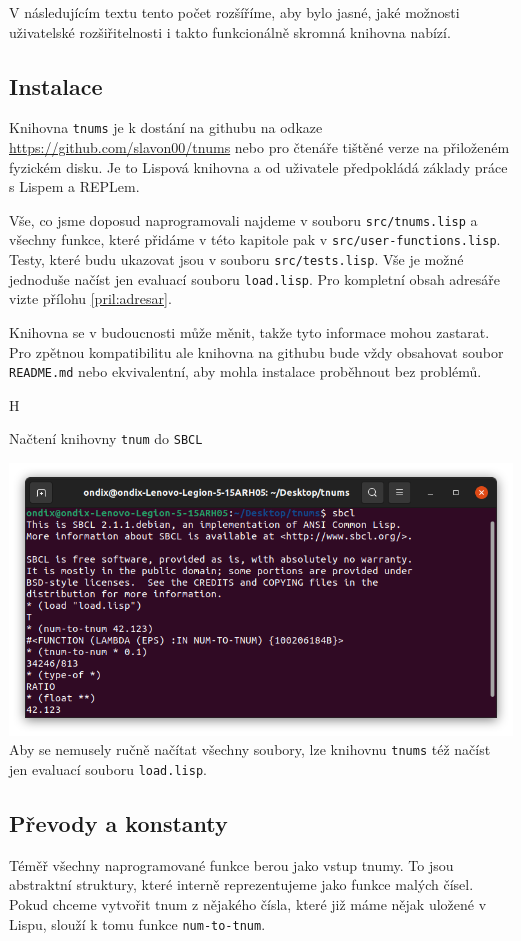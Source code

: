 V následujícím textu tento počet rozšíříme, aby bylo jasné, jaké možnosti uživatelské rozšiřitelnosti i takto funkcionálně skromná knihovna nabízí.

\subsection{Instalace}
Knihovna \texttt{tnums} je k dostání na githubu na odkaze \url{https://github.com/slavon00/tnums} nebo pro čtenáře tištěné verze na přiloženém fyzickém disku. Je to Lispová knihovna a od uživatele předpokládá základy práce s Lispem a REPLem.

Vše, co jsme doposud naprogramovali najdeme v souboru \texttt{src/tnums.lisp} a všechny funkce, které přidáme v této kapitole pak v \texttt{src/user-functions.lisp}. Testy, které budu ukazovat jsou v souboru \texttt{src/tests.lisp}. Vše je možné jednoduše načíst jen evaluací souboru \texttt{load.lisp}. Pro kompletní obsah adresáře vizte přílohu \ref{pril:adresar}.

Knihovna se v budoucnosti může měnit, takže tyto informace mohou zastarat. Pro zpětnou kompatibilitu ale knihovna na githubu bude vždy obsahovat soubor \texttt{README.md} nebo ekvivalentní, aby mohla instalace proběhnout bez problémů.

\begin{myfigure}{H}
\caption{Načtení knihovny \texttt{tnum} do \texttt{SBCL}}
\includegraphics[width=\linewidth]{./graphics/loading.png}\label{obr:loading}
Aby se nemusely ručně načítat všechny soubory, lze knihovnu \texttt{tnums} též načíst jen evaluací souboru \texttt{load.lisp}. 
\end{myfigure}

\subsection{Převody a konstanty}
Téměř všechny naprogramované funkce berou jako vstup tnumy. To jsou abstraktní struktury, které interně reprezentujeme jako funkce malých čísel. Pokud chceme vytvořit tnum z nějakého čísla, které již máme nějak uložené v Lispu, slouží k tomu funkce \texttt{num-to-tnum}.

